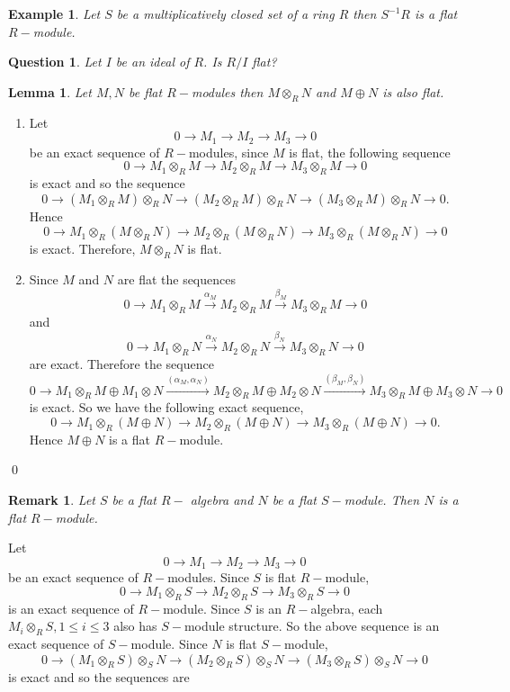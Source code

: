 \documentclass[11pt]{amsart}
\newtheorem{qns}[theorem]{Question}
\newtheorem{eg}[theorem]{Example}
\newtheorem{remark}[theorem]{Remark}%
\newtheorem{lemma}[theorem]{Lemma}%
\begin{document}
\begin{eg}
Let $S$ be a multiplicatively closed set of a ring $R$ then $S^{-1}R$ is a flat $R-$module.
\end{eg}

\begin{qns}
Let $I$ be an ideal of $R$. Is $R/I$ flat?
\end{qns}

\begin{lemma}
Let $M,N$ be flat $R-$modules then $M\otimes_R N$ and $M\oplus N$ is also flat.
\end{lemma}

\proof \begin{enumerate}
\item Let $$0\to M_1\to M_2\to M_3\to 0$$ be an exact sequence of $R-$modules, since $M$ is flat, the following sequence $$0\to M_1\otimes_R M\to M_2\otimes_R M\to M_3\otimes_R M\to 0$$ is exact and so the sequence $$0\to (M_1\otimes_R M)\otimes_R N\to (M_2\otimes_R M)\otimes_R N\to (M_3\otimes_R M)\otimes_R N\to 0.$$ Hence $$0\to M_1\otimes_R (M\otimes_R N)\to M_2\otimes_R (M\otimes_R N)\to M_3\otimes_R (M\otimes_R N)\to 0$$ is exact. Therefore, $M\otimes_R N$ is flat.\\

\item Since $M$ and $N$ are flat the sequences $$0\to M_1\otimes_R M\xrightarrow{\alpha_M} M_2\otimes_R M\xrightarrow{\beta_M} M_3\otimes_R M\to 0$$ and $$0\to M_1\otimes_R N\xrightarrow{\alpha_N} M_2\otimes_R N\xrightarrow{\beta_N} M_3\otimes_R N\to 0$$ are exact. Therefore the sequence $$0\to M_1\otimes_R M\oplus M_1\otimes N\xrightarrow{(\alpha_M,\alpha_N)} M_2\otimes_R M\oplus M_2\otimes N\xrightarrow{(\beta_M,\beta_N)} M_3\otimes_R M\oplus M_3\otimes N\to 0$$ is exact. So we have the following exact sequence, $$0\to M_1\otimes_R (M\oplus N)\to M_2\otimes_R (M\oplus N)\to M_3\otimes_R (M\oplus N)\to 0.$$
Hence $M\oplus N$ is a flat $R-$module.
\end{enumerate}
\qed

\begin{remark}
Let $S$ be a flat $R-$ algebra and $N$ be a flat $S-$module. Then $N$ is a flat $R-$module.
\end{remark}

\proof Let $$0\to M_1\to M_2\to M_3\to 0$$ be an exact sequence of $R-$modules. Since $S$ is flat $R-$module, $$0\to M_1\otimes_R S\to M_2\otimes_R S\to M_3\otimes_R S\to 0$$ is an exact sequence of $R-$module. Since $S$ is an $R-$algebra, each $M_i\otimes_R S,1\leq i\leq 3$ also has $S-$module structure. So the above sequence is an exact sequence of $S-$module. Since $N$ is flat $S-$module, $$0\to (M_1\otimes_R S)\otimes_S N\to (M_2\otimes_R S)\otimes_S N\to (M_3\otimes_R S)\otimes_S N\to 0$$ is exact and so the sequences are 
\end{document}
